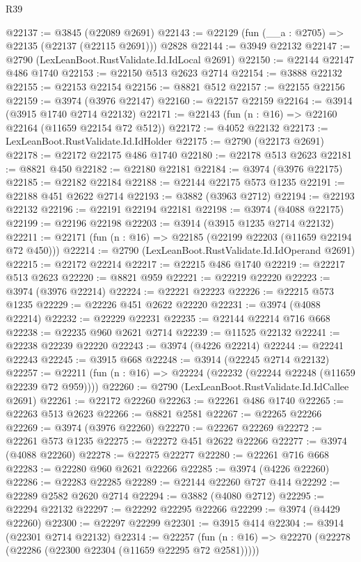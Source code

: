 \begin{lexlean}{R39}
\begin{coremodule}
@22137 := @3845 (@22089 @2691)
@22143 := @22129 (fun (__a : @2705) => @22135 (@22137 (@22115 @2691))) @2828
@22144 := @3949 @22132
@22147 := @2790 (LexLeanBoot.RustValidate.Id.IdLocal @2691)
@22150 := @22144 @22147 @486 @1740
@22153 := @22150 @513 @2623 @2714
@22154 := @3888 @22132
@22155 := @22153 @22154
@22156 := @8821 @512
@22157 := @22155 @22156
@22159 := @3974 (@3976 @22147)
@22160 := @22157 @22159
@22164 := @3914 (@3915 @1740 @2714 @22132)
@22171 := @22143 (fun (n : @16) => @22160 @22164 (@11659 @22154 @72 @512))
@22172 := @4052 @22132
@22173 := LexLeanBoot.RustValidate.Id.IdHolder
@22175 := @2790 (@22173 @2691)
@22178 := @22172 @22175 @486 @1740
@22180 := @22178 @513 @2623
@22181 := @8821 @450
@22182 := @22180 @22181
@22184 := @3974 (@3976 @22175)
@22185 := @22182 @22184
@22188 := @22144 @22175 @573 @1235
@22191 := @22188 @451 @2622 @2714
@22193 := @3882 (@3963 @2712)
@22194 := @22193 @22132
@22196 := @22191 @22194 @22181
@22198 := @3974 (@4088 @22175)
@22199 := @22196 @22198
@22203 := @3914 (@3915 @1235 @2714 @22132)
@22211 := @22171 (fun (n : @16) => @22185 (@22199 @22203 (@11659 @22194 @72 @450)))
@22214 := @2790 (LexLeanBoot.RustValidate.Id.IdOperand @2691)
@22215 := @22172 @22214
@22217 := @22215 @486 @1740
@22219 := @22217 @513 @2623
@22220 := @8821 @959
@22221 := @22219 @22220
@22223 := @3974 (@3976 @22214)
@22224 := @22221 @22223
@22226 := @22215 @573 @1235
@22229 := @22226 @451 @2622 @22220
@22231 := @3974 (@4088 @22214)
@22232 := @22229 @22231
@22235 := @22144 @22214 @716 @668
@22238 := @22235 @960 @2621 @2714
@22239 := @11525 @22132
@22241 := @22238 @22239 @22220
@22243 := @3974 (@4226 @22214)
@22244 := @22241 @22243
@22245 := @3915 @668
@22248 := @3914 (@22245 @2714 @22132)
@22257 := @22211 (fun (n : @16) => @22224 (@22232 (@22244 @22248 (@11659 @22239 @72 @959))))
@22260 := @2790 (LexLeanBoot.RustValidate.Id.IdCallee @2691)
@22261 := @22172 @22260
@22263 := @22261 @486 @1740
@22265 := @22263 @513 @2623
@22266 := @8821 @2581
@22267 := @22265 @22266
@22269 := @3974 (@3976 @22260)
@22270 := @22267 @22269
@22272 := @22261 @573 @1235
@22275 := @22272 @451 @2622 @22266
@22277 := @3974 (@4088 @22260)
@22278 := @22275 @22277
@22280 := @22261 @716 @668
@22283 := @22280 @960 @2621 @22266
@22285 := @3974 (@4226 @22260)
@22286 := @22283 @22285
@22289 := @22144 @22260 @727 @414
@22292 := @22289 @2582 @2620 @2714
@22294 := @3882 (@4080 @2712)
@22295 := @22294 @22132
@22297 := @22292 @22295 @22266
@22299 := @3974 (@4429 @22260)
@22300 := @22297 @22299
@22301 := @3915 @414
@22304 := @3914 (@22301 @2714 @22132)
@22314 := @22257
    (fun (n : @16) => @22270 (@22278 (@22286 (@22300 @22304 (@11659 @22295 @72 @2581)))))

\end{coremodule}
\end{lexlean}

